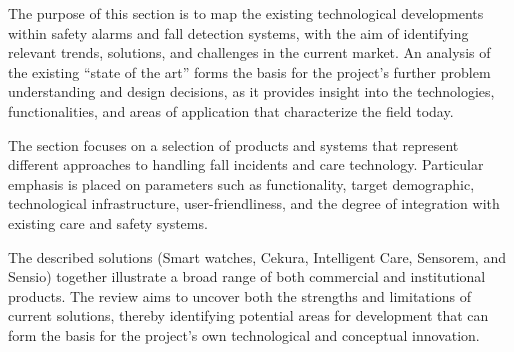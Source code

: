 The purpose of this section is to map the existing technological developments within safety alarms and fall detection systems, with the aim of identifying relevant trends, solutions, and challenges in the current market. An analysis of the existing “state of the art” forms the basis for the project’s further problem understanding and design decisions, as it provides insight into the technologies, functionalities, and areas of application that characterize the field today.

The section focuses on a selection of products and systems that represent different approaches to handling fall incidents and care technology. Particular emphasis is placed on parameters such as functionality, target demographic, technological infrastructure, user-friendliness, and the degree of integration with existing care and safety systems.

The described solutions (Smart watches, Cekura, Intelligent Care, Sensorem, and Sensio) together illustrate a broad range of both commercial and institutional products. The review aims to uncover both the strengths and limitations of current solutions, thereby identifying potential areas for development that can form the basis for the project’s own technological and conceptual innovation.
